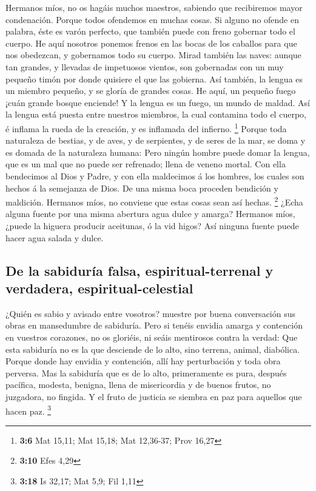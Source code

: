 Hermanos míos, no os hagáis muchos maestros, sabiendo que
recibiremos mayor condenación.  Porque todos ofendemos en
muchas cosas. Si alguno no ofende en palabra, éste es varón perfecto,
que también puede con freno gobernar todo el cuerpo.  He
aquí nosotros ponemos frenos en las bocas de los caballos para que nos
obedezcan, y gobernamos todo su cuerpo.  Mirad también las
naves: aunque tan grandes, y llevadas de impetuosos vientos, son
gobernadas con un muy pequeño timón por donde quisiere el que las
gobierna.  Así también, la lengua es un miembro pequeño, y
se gloría de grandes cosas. He aquí, un pequeño fuego ¡cuán grande
bosque enciende!  Y la lengua es un fuego, un mundo de
maldad. Así la lengua está puesta entre nuestros miembros, la cual
contamina todo el cuerpo, é inflama la rueda de la creación, y es
inflamada del infierno. \footnote{\textbf{3:6} Mat 15,11; Mat 15,18; Mat
  12,36-37; Prov 16,27}  Porque toda naturaleza de bestias,
y de aves, y de serpientes, y de seres de la mar, se doma y es domada de
la naturaleza humana:  Pero ningún hombre puede domar la
lengua, que es un mal que no puede ser refrenado; llena de veneno
mortal.  Con ella bendecimos al Dios y Padre, y con ella
maldecimos á los hombres, los cuales son hechos á la semejanza de Dios.
 De una misma boca proceden bendición y maldición. Hermanos
míos, no conviene que estas cosas sean así hechas. \footnote{\textbf{3:10}
  Efes 4,29}  ¿Echa alguna fuente por una misma abertura
agua dulce y amarga?  Hermanos míos, ¿puede la higuera
producir aceitunas, ó la vid higos? Así ninguna fuente puede hacer agua
salada y dulce.

\hypertarget{de-la-sabiduruxeda-falsa-espiritual-terrenal-y-verdadera-espiritual-celestial}{%
\subsection{De la sabiduría falsa, espiritual-terrenal y verdadera,
espiritual-celestial}\label{de-la-sabiduruxeda-falsa-espiritual-terrenal-y-verdadera-espiritual-celestial}}

 ¿Quién es sabio y avisado entre vosotros? muestre por
buena conversación sus obras en mansedumbre de sabiduría. 
Pero si tenéis envidia amarga y contención en vuestros corazones, no os
gloriéis, ni seáis mentirosos contra la verdad:  Que esta
sabiduría no es la que desciende de lo alto, sino terrena, animal,
diabólica.  Porque donde hay envidia y contención, allí hay
perturbación y toda obra perversa.  Mas la sabiduría que es
de lo alto, primeramente es pura, después pacífica, modesta, benigna,
llena de misericordia y de buenos frutos, no juzgadora, no fingida.
 Y el fruto de justicia se siembra en paz para aquellos que
hacen paz. \footnote{\textbf{3:18} Is 32,17; Mat 5,9; Fil 1,11}

